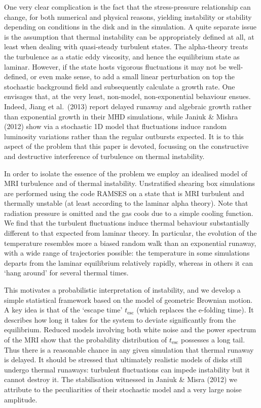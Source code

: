 \documentclass[useAMS]{mn2e}
\begin{document}
One very clear complication is the fact that the
stress-pressure relationship can change,
for both numerical and physical reasons, yielding
instability or stability depending on conditions in the disk and
in the simulation. 
A quite separate issue is the assumption that thermal instability can
be appropriately defined at all, at least when dealing with quasi-steady
turbulent states. The alpha-theory treats the turbulence as a static
eddy viscosity, and hence the equilibrium state as laminar. However, if the state hosts
vigorous fluctuations it may not be well-defined, or  even make sense,
to add a small linear
perturbation on top the stochastic background field
and subsequently
calculate
a growth rate.
One
envisages that, at the very least, non-model, non-exponential behaviour
ensues. Indeed, Jiang et al.~(2013) report delayed runaway and algebraic
growth rather than exponential growth in their MHD simulations, while
Janiuk \& Mishra (2012) show via a stochastic 1D model
that fluctuations induce random luminosity variations rather than the
regular outbursts expected.
It is to this aspect of the problem that this paper is devoted,
focussing
on the constructive and destructive interference of turbulence
on thermal instability.


In order to isolate the essence of the problem
we employ an idealised model of MRI turbulence and of
thermal instability. Unstratified shearing box simulations are performed
using the code RAMSES on a state that is MRI turbulent and thermally
unstable (at least according to the laminar alpha theory). Note that radiation pressure
is omitted and the gas cools due to a simple cooling function. 
We find that the turbulent fluctuations induce
thermal behaviour substantially different to that expected from
laminar theory.
In
particular, the evolution of the temperature resembles more a biased random
walk than an exponential runaway, with
a wide range of trajectories possible: the temperature in some simulations
departs from the laminar equilibrium relatively rapidly,
whereas in others it can `hang around' for several thermal times. 

This motivates a probabilistic interpretation of instability, and we
develop a simple statistical framework based on
the model of geometric Brownian
motion.
A key idea is that of the `escape time' $t_{\text{esc}}$ (which replaces the e-folding
time). It describes how long it takes for the system to deviate
significantly from the equilibrium. Reduced models involving both
white noise and the power spectrum of the MRI show that the
probability distribution of $t_{\text{esc}}$ possesses a long tail.
Thus there is a reasonable chance in any given
simulation that thermal runaway is delayed.
It should be stressed that ultimately realistic models of
disks still undergo
thermal runaways: turbulent fluctuations can impede instability but it
cannot destroy it. The stabilisation witnessed in Janiuk \& Misra
(2012) we attribute to the peculiarities of their stochastic model and
a very large noise amplitude.
\end{document}
